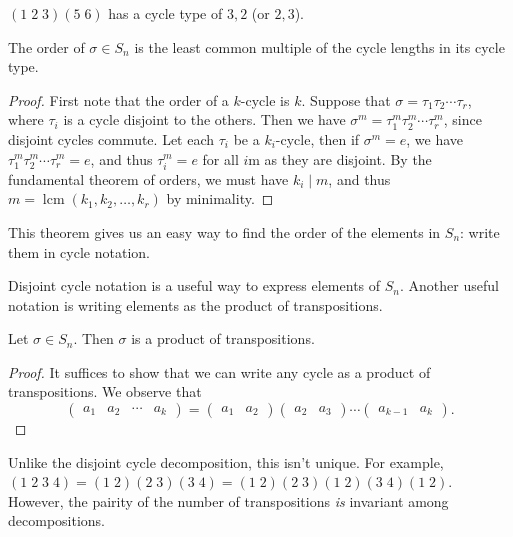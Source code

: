 \begin{example}
	$(1\; 2\; 3)(5\; 6)$ has a cycle type of $3, 2$ (or $2, 3$).
\end{example}

\begin{theorem}
	The order of $\sigma \in S_n$ is the least common multiple of the cycle lengths in its cycle type.
\end{theorem}
\begin{proof}
	First note that the order of a $k$-cycle is $k$. Suppose that $\sigma = \tau_1 \tau_2 \cdots \tau_r$, where $\tau_i$ is a cycle disjoint to the others. Then we have $\sigma^m = \tau_1^m \tau_2^m \cdots \tau_r^m$, since disjoint cycles commute. Let each $\tau_i$ be a $k_i$-cycle, then if $\sigma^m = e$, we have $\tau_1^m \tau_2^m \cdots \tau_r^m = e$, and thus $\tau_i^m = e$ for all $i$m as they are disjoint. By the fundamental theorem of orders, we must have $k_i \mid m$, and thus $m = \operatorname{lcm}(k_1, k_2, \dots, k_r)$ by minimality.
\end{proof}

This theorem gives us an easy way to find the order of the elements in $S_n$: write them in cycle notation.

Disjoint cycle notation is a useful way to express elements of $S_n$. Another useful notation is writing elements as the product of transpositions.

\begin{theorem}
	Let $\sigma \in S_n$. Then $\sigma$ is a product of transpositions.
\end{theorem}
\begin{proof}
	It suffices to show that we can write any cycle as a product of transpositions. We observe that
	$$
	\begin{pmatrix} a_1 & a_2 & \cdots & a_k \end{pmatrix} = \begin{pmatrix} a_1 & a_2 \end{pmatrix}  \begin{pmatrix} a_2 & a_3 \end{pmatrix} \cdots  \begin{pmatrix} a_{k - 1} & a_k \end{pmatrix}.
	$$
\end{proof}

Unlike the disjoint cycle decomposition, this isn't unique. For example, $(1\; 2\; 3\; 4) = (1\; 2)(2\; 3)(3\; 4) = (1\; 2) (2\; 3)(1\; 2)(3\; 4)(1\; 2)$. However, the pairity of the number of transpositions \emph{is} invariant among decompositions.

